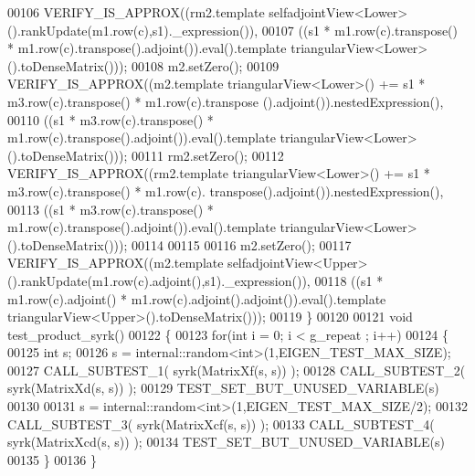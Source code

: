 \begin{DoxyCode}
00106   VERIFY\_IS\_APPROX((rm2.template selfadjointView<Lower>().rankUpdate(m1.row(c),s1).\_expression()),
00107                    ((s1 * m1.row(c).transpose() * m1.row(c).transpose().adjoint()).eval().template 
      triangularView<Lower>().toDenseMatrix()));
00108   m2.setZero();
00109   VERIFY\_IS\_APPROX((m2.template triangularView<Lower>() += s1 * m3.row(c).transpose() * m1.row(c).transpose
      ().adjoint()).nestedExpression(),
00110                    ((s1 * m3.row(c).transpose() * m1.row(c).transpose().adjoint()).eval().template 
      triangularView<Lower>().toDenseMatrix()));
00111   rm2.setZero();
00112   VERIFY\_IS\_APPROX((rm2.template triangularView<Lower>() += s1 * m3.row(c).transpose() * m1.row(c).
      transpose().adjoint()).nestedExpression(),
00113                    ((s1 * m3.row(c).transpose() * m1.row(c).transpose().adjoint()).eval().template 
      triangularView<Lower>().toDenseMatrix()));
00114   
00115   
00116   m2.setZero();
00117   VERIFY\_IS\_APPROX((m2.template selfadjointView<Upper>().rankUpdate(m1.row(c).adjoint(),s1).\_expression()),
00118                    ((s1 * m1.row(c).adjoint() * m1.row(c).adjoint().adjoint()).eval().template 
      triangularView<Upper>().toDenseMatrix()));
00119 \}
00120 
00121 \textcolor{keywordtype}{void} test\_product\_syrk()
00122 \{
00123   \textcolor{keywordflow}{for}(\textcolor{keywordtype}{int} i = 0; i < g\_repeat ; i++)
00124   \{
00125     \textcolor{keywordtype}{int} s;
00126     s = internal::random<int>(1,EIGEN\_TEST\_MAX\_SIZE);
00127     CALL\_SUBTEST\_1( syrk(MatrixXf(s, s)) );
00128     CALL\_SUBTEST\_2( syrk(MatrixXd(s, s)) );
00129     TEST\_SET\_BUT\_UNUSED\_VARIABLE(s)
00130     
00131     s = internal::random<int>(1,EIGEN\_TEST\_MAX\_SIZE/2);
00132     CALL\_SUBTEST\_3( syrk(MatrixXcf(s, s)) );
00133     CALL\_SUBTEST\_4( syrk(MatrixXcd(s, s)) );
00134     TEST\_SET\_BUT\_UNUSED\_VARIABLE(s)
00135   \}
00136 \}
\end{DoxyCode}

